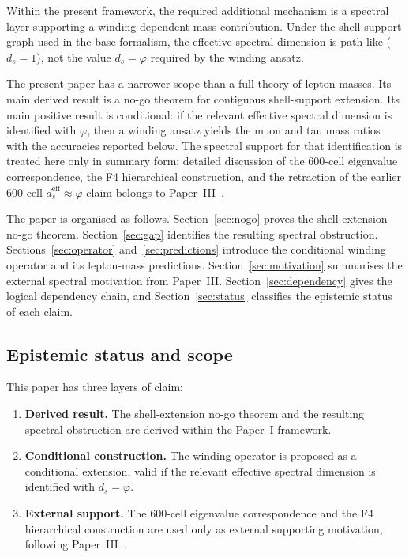 \documentclass[12pt]{article}
\newcommand{\phig}{\varphi}
\newcommand{\ds}{d_s}
\newcommand{\dseff}{d_s^{\mathrm{eff}}}
\begin{document}
Within the present framework, the required additional mechanism is a spectral layer supporting a winding-dependent mass contribution. Under the shell-support graph used in the base formalism, the effective spectral dimension is path-like ($\ds = 1$), not the value $\ds = \phig$ required by the winding ansatz.

The present paper has a narrower scope than a full theory of lepton masses. Its main derived result is a no-go theorem for contiguous shell-support extension. Its main positive result is conditional: if the relevant effective spectral dimension is identified with $\phig$, then a winding ansatz yields the muon and tau mass ratios with the accuracies reported below. The spectral support for that identification is treated here only in summary form; detailed discussion of the 600-cell eigenvalue correspondence, the F4 hierarchical construction, and the retraction of the earlier 600-cell $\dseff \approx \phig$ claim belongs to Paper~III~\citep{SmartIII}.

The paper is organised as follows. Section~\ref{sec:nogo} proves the shell-extension no-go theorem. Section~\ref{sec:gap} identifies the resulting spectral obstruction. Sections~\ref{sec:operator} and~\ref{sec:predictions} introduce the conditional winding operator and its lepton-mass predictions. Section~\ref{sec:motivation} summarises the external spectral motivation from Paper~III. Section~\ref{sec:dependency} gives the logical dependency chain, and Section~\ref{sec:status} classifies the epistemic status of each claim.

\subsection*{Epistemic status and scope}

This paper has three layers of claim:

\begin{enumerate}
    \item \textbf{Derived result.} The shell-extension no-go theorem and the resulting spectral obstruction are derived within the Paper~I framework.
    \item \textbf{Conditional construction.} The winding operator is proposed as a conditional extension, valid if the relevant effective spectral dimension is identified with $\ds = \phig$.
    \item \textbf{External support.} The 600-cell eigenvalue correspondence and the F4 hierarchical construction are used only as external supporting motivation, following Paper~III~\citep{SmartIII}.
\end{enumerate}
\end{document}
